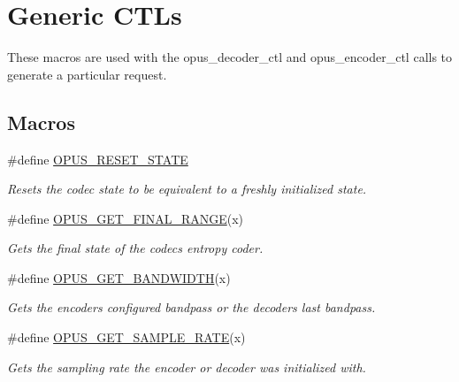 \hypertarget{group__opus__genericctls}{}\section{Generic C\+T\+Ls}
\label{group__opus__genericctls}


These macros are used with the {\ttfamily opus\+\_\+decoder\+\_\+ctl} and {\ttfamily opus\+\_\+encoder\+\_\+ctl} calls to generate a particular request.  


\subsection*{Macros}
\begin{DoxyCompactItemize}
\item 
\#define \hyperlink{group__opus__genericctls_gadc74e4fa8bcdf9994187d52d92207337}{O\+P\+U\+S\+\_\+\+R\+E\+S\+E\+T\+\_\+\+S\+T\+A\+TE}
\begin{DoxyCompactList}\small\item\em Resets the codec state to be equivalent to a freshly initialized state. \end{DoxyCompactList}\item 
\#define \hyperlink{group__opus__genericctls_ga1108a508aa475f964d247c1b04d26d89}{O\+P\+U\+S\+\_\+\+G\+E\+T\+\_\+\+F\+I\+N\+A\+L\+\_\+\+R\+A\+N\+GE}(x)
\begin{DoxyCompactList}\small\item\em Gets the final state of the codec\textquotesingle{}s entropy coder. \end{DoxyCompactList}\item 
\#define \hyperlink{group__opus__genericctls_ga29db1d9b5e670debec54d1163ad2ec62}{O\+P\+U\+S\+\_\+\+G\+E\+T\+\_\+\+B\+A\+N\+D\+W\+I\+D\+TH}(x)
\begin{DoxyCompactList}\small\item\em Gets the encoder\textquotesingle{}s configured bandpass or the decoder\textquotesingle{}s last bandpass. \end{DoxyCompactList}\item 
\#define \hyperlink{group__opus__genericctls_gac8ad425424211faae6a0fbfb7c28bb51}{O\+P\+U\+S\+\_\+\+G\+E\+T\+\_\+\+S\+A\+M\+P\+L\+E\+\_\+\+R\+A\+TE}(x)
\begin{DoxyCompactList}\small\item\em Gets the sampling rate the encoder or decoder was initialized with. \end{DoxyCompactList}\item 

\end{DoxyCompactItemize}
